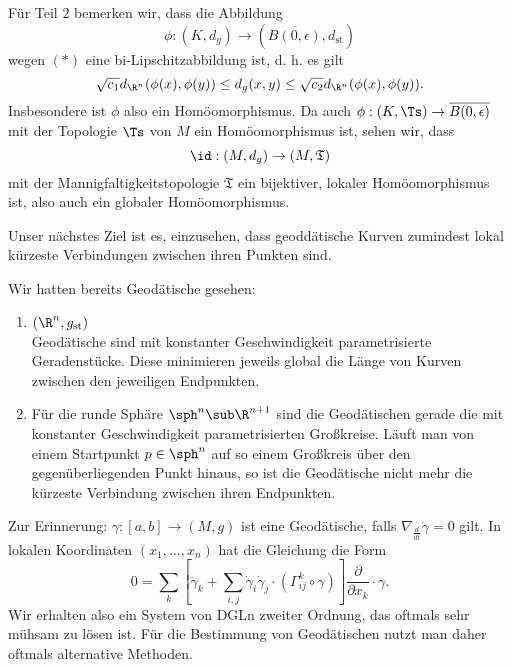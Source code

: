 \begin{beweis}
Für Teil $2$ bemerken wir, dass die Abbildung
\begin{equation}
\phi: (K, d_g) \to (\overline{B(0,\epsilon)}, d_\text{st})
\end{equation}
wegen $(\ast)$ eine bi-Lipschitzabbildung ist, d. h. es gilt
\begin{equation}
\sqrt{c_1} d_{\R^n} (\phi (x), \phi (y) ) \leq d_g(x,y) \leq \sqrt{c_2} d_{\R^n} (\phi(x), \phi(y)).
\end{equation}
Insbesondere ist $\phi$ also ein Homöomorphismus. Da auch $\phi: (K, \Ts) \to \overline{B(0,\epsilon)}$ mit der Topologie $\Ts$ von $M$ ein Homöomorphismus ist, sehen wir, dass 
\begin{equation}
\id: (M, d_g) \to (M, \mathfrak{T})
\end{equation}
mit der Mannigfaltigkeitstopologie $\mathfrak{T}$ ein bijektiver, lokaler Homöomorphismus ist, also auch ein globaler Homöomorphismus.
\end{beweis}
Unser nächstes Ziel ist es, einzusehen, dass geoddätische Kurven zumindest lokal kürzeste Verbindungen zwischen ihren Punkten sind.
\begin{beispiele}
Wir hatten bereits Geodätische gesehen:
\begin{enumerate}
\item $(\R^n, g_\text{st})$\\
Geodätische sind mit konstanter Geschwindigkeit parametrisierte Geradenstücke. Diese minimieren jeweils global die Länge von Kurven zwischen den jeweiligen Endpunkten.
\item Für die runde Sphäre $\sph^n \sub \R^{n+1}$ sind die Geodätischen gerade die mit konstanter Geschwindigkeit parametrisierten Großkreise. Läuft man von einem Startpunkt $p \in \sph^n$ auf so einem Großkreis über den gegenüberliegenden Punkt hinaus, so ist die Geodätische nicht mehr die kürzeste Verbindung zwischen ihren Endpunkten.
\end{enumerate}
\end{beispiele}
Zur Erinnerung: $\gamma: [a,b] \to (M,g)$ ist eine Geodätische, falls $\nabla_\frac{d}{dt} \dot{\gamma} = 0$ gilt. In lokalen Koordinaten $(x_1, \dots, x_n)$ hat die Gleichung die Form
\begin{equation}
0 = \sum_k \left[\ddot{\gamma}_k + \sum_{i,j} \dot{\gamma}_i \dot{\gamma}_j \cdot (\Gamma^k_{ij} \circ \gamma) \right] \frac{\partial}{\partial x_k} \cdot \gamma.
\end{equation}
Wir erhalten also ein System von DGLn zweiter Ordnung, das oftmals sehr mühsam zu lösen ist. Für die Bestimmung von Geodätischen nutzt man daher oftmals alternative Methoden.
